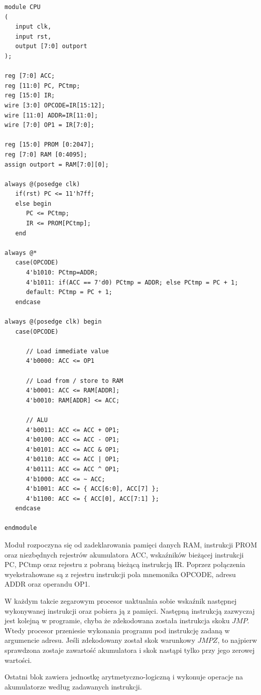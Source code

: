 \documentclass[a4paper,12pt]{article}
\begin{document}
\begin{lstlisting}[label=CPU,caption=CPU.v]
module CPU
(
   input clk,
   input rst,
   output [7:0] outport
);

reg [7:0] ACC;
reg [11:0] PC, PCtmp;
reg [15:0] IR;
wire [3:0] OPCODE=IR[15:12];
wire [11:0] ADDR=IR[11:0];
wire [7:0] OP1 = IR[7:0];

reg [15:0] PROM [0:2047];
reg [7:0] RAM [0:4095];
assign outport = RAM[7:0][0];

always @(posedge clk)
   if(rst) PC <= 11'h7ff;
   else begin
      PC <= PCtmp;
      IR <= PROM[PCtmp];
   end

always @*
   case(OPCODE)
      4'b1010: PCtmp=ADDR;
      4'b1011: if(ACC == 7'd0) PCtmp = ADDR; else PCtmp = PC + 1;
      default: PCtmp = PC + 1;
   endcase

always @(posedge clk) begin
   case(OPCODE)

      // Load immediate value
      4'b0000: ACC <= OP1

      // Load from / store to RAM
      4'b0001: ACC <= RAM[ADDR];
      4'b0010: RAM[ADDR] <= ACC;

      // ALU
      4'b0011: ACC <= ACC + OP1;
      4'b0100: ACC <= ACC - OP1;
      4'b0101: ACC <= ACC & OP1;
      4'b0110: ACC <= ACC | OP1;
      4'b0111: ACC <= ACC ^ OP1;
      4'b1000: ACC <= ~ ACC;
      4'b1001: ACC <= { ACC[6:0], ACC[7] };
      4'b1100: ACC <= { ACC[0], ACC[7:1] };
   endcase

endmodule
\end{lstlisting}

Moduł rozpoczyna się od zadeklarowania pamięci danych RAM, instrukcji PROM oraz niezbędnych rejestrów akumulatora ACC, wskaźników bieżącej instrukcji PC, PCtmp oraz rejestru z pobraną bieżącą instrukcją IR. Poprzez połączenia wyekstrahowane są z rejestru instrukcji pola mnemonika OPCODE, adresu ADDR oraz operandu OP1.

W każdym takcie zegarowym procesor uaktualnia sobie wskaźnik następnej wykonywanej instrukcji oraz pobiera ją z pamięci. Następną instrukcją zazwyczaj jest kolejną w programie, chyba że zdekodowana została instrukcja skoku $JMP$. Wtedy procesor przeniesie wykonania programu pod instrukcję zadaną w argumencie adresu. Jeśli zdekodowany został skok warunkowy $JMPZ$, to najpierw sprawdzona zostaje zawartość akumulatora i skok nastąpi tylko przy jego zerowej wartości.

Ostatni blok zawiera jednostkę arytmetyczno-logiczną i wykonuje operacje na akumulatorze według zadawanych instrukcji.
\end{document}
